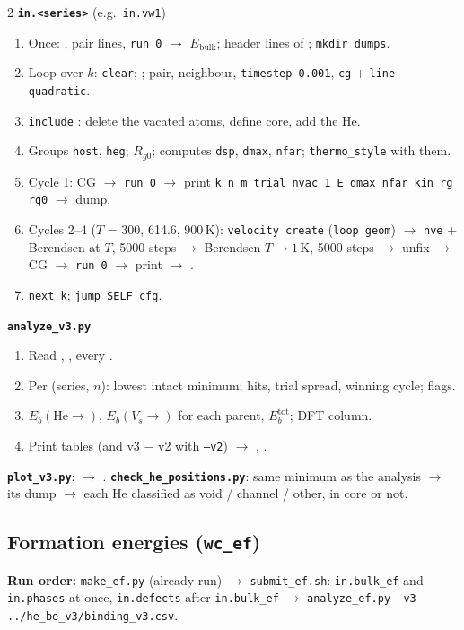 \documentclass[10pt]{article}
\newcommand{\cmd}[1]{\texttt{\small #1}}
\newcommand{\He}{\mathrm{He}}
\begin{document}
\begin{multicols}{2}
\textbf{\cmd{in.<series>}} (e.g.\ \cmd{in.vw1})
\begin{enumerate}
\item Once: , pair lines, \cmd{run 0} $\rightarrow$ $E_\mathrm{bulk}$; header lines of ; \cmd{mkdir dumps}.
\item Loop over $k$: \cmd{clear}; ; pair, neighbour, \cmd{timestep 0.001}, \cmd{cg} + \cmd{line quadratic}.
\item \cmd{include} : delete the vacated atoms, define core, add the He.
\item Groups \cmd{host}, \cmd{heg}; $R_{g0}$; computes \cmd{dsp}, \cmd{dmax}, \cmd{nfar}; \cmd{thermo\_style} with them.
\item Cycle 1: CG $\rightarrow$ \cmd{run 0} $\rightarrow$ print \cmd{k n m trial nvac 1 E dmax nfar kin rg rg0} $\rightarrow$ dump.
\item Cycles 2--4 ($T$ = 300, 614.6, 900\,K): \cmd{velocity create} (\cmd{loop geom}) $\rightarrow$ \cmd{nve} + Berendsen at $T$, 5000 steps $\rightarrow$ Berendsen $T\to1$\,K, 5000 steps $\rightarrow$ unfix $\rightarrow$ CG $\rightarrow$ \cmd{run 0} $\rightarrow$ print $\rightarrow$ .
\item \cmd{next k}; \cmd{jump SELF cfg}.
\end{enumerate}

\textbf{\cmd{analyze\_v3.py}}
\begin{enumerate}
\item Read , , every .
\item Per (series, $n$): lowest intact minimum; hits, trial spread, winning cycle; flags.
\item $E_b(\He\to)$, $E_b(V_s\to)$ for each parent, $E_b^\mathrm{tot}$; DFT column.
\item Print tables (and v3 $-$ v2 with \cmd{--v2}) $\rightarrow$ , .
\end{enumerate}
\textbf{\cmd{plot\_v3.py}}:  $\rightarrow$ .\quad
\textbf{\cmd{check\_he\_positions.py}}: same minimum as the analysis $\rightarrow$ its dump $\rightarrow$ each He classified as void / channel / other, in core or not.
\end{multicols}

\subsection{Formation energies (\texttt{wc\_ef})}
\textbf{Run order:} \cmd{make\_ef.py} (already run) $\rightarrow$ \cmd{submit\_ef.sh}: \cmd{in.bulk\_ef} and
\cmd{in.phases} at once, \cmd{in.defects} after \cmd{in.bulk\_ef} $\rightarrow$
\cmd{analyze\_ef.py --v3 ../he\_be\_v3/binding\_v3.csv}.
\end{document}
